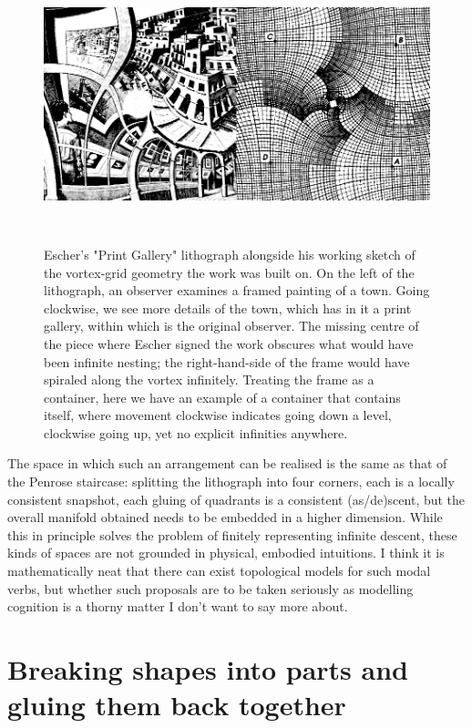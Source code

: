 \begin{figure}[h!]
\centering
\includegraphics[height=8cm]{figures/bubbles/combined}
\caption{Escher's "Print Gallery" lithograph alongside his working sketch of the vortex-grid geometry the work was built on. On the left of the lithograph, an observer examines a framed painting of a town. Going clockwise, we see more details of the town, which has in it a print gallery, within which is the original observer. The missing centre of the piece where Escher signed the work obscures what would have been infinite nesting; the right-hand-side of the frame would have spiraled along the vortex infinitely. Treating the frame as a container, here we have an example of a container that contains itself, where movement clockwise indicates going down a level, clockwise going up, yet no explicit infinities anywhere.}
\label{fig:gallery}
\end{figure}

The space in which such an arrangement can be realised is the same as that of the Penrose staircase: splitting the lithograph into four corners, each is a locally consistent snapshot, each gluing of quadrants is a consistent (as/de)scent, but the overall manifold obtained needs to be embedded in a higher dimension. While this in principle solves the problem of finitely representing infinite descent, these kinds of spaces are not grounded in physical, embodied intuitions. I think it is mathematically neat that there can exist topological models for such modal verbs, but whether such proposals are to be taken seriously as modelling cognition is a thorny matter I don't want to say more about.

\newpage
\section{Breaking shapes into parts and gluing them back together}

